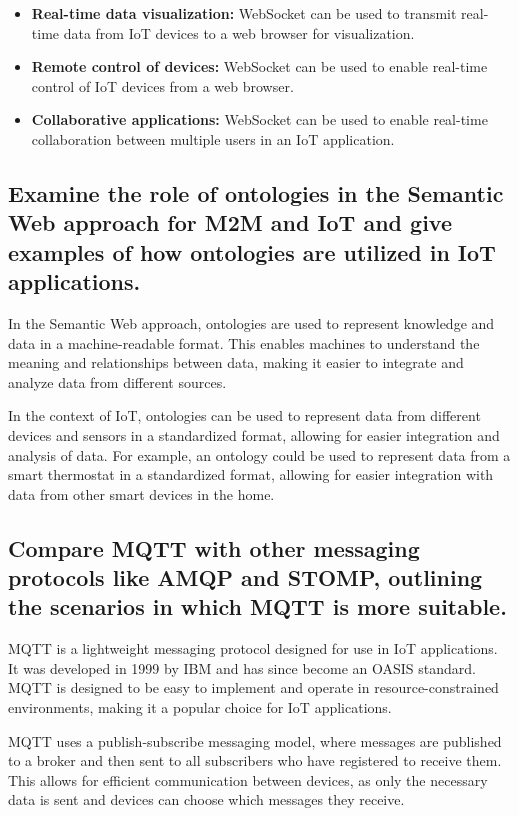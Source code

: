 \documentclass[12pt, a4paper, oneside]{article}
\begin{document}
\begin{itemize}
	\item \textbf{Real-time data visualization:} WebSocket can be used to transmit real-time data from IoT devices to a web browser for visualization.
	\item \textbf{Remote control of devices:} WebSocket can be used to enable real-time control of IoT devices from a web browser.
	\item \textbf{Collaborative applications:} WebSocket can be used to enable real-time collaboration between multiple users in an IoT application.
\end{itemize}

\subsection{Examine the role of ontologies in the Semantic Web approach for M2M and IoT and give examples of how ontologies are utilized in IoT applications.}

In the Semantic Web approach, ontologies are used to represent knowledge and data in a machine-readable format. This enables machines to understand the meaning and relationships between data, making it easier to integrate and analyze data from different sources.

In the context of IoT, ontologies can be used to represent data from different devices and sensors in a standardized format,
allowing for easier integration and analysis of data. For example, an ontology could be used to represent data from a smart thermostat in a standardized format, allowing for easier integration with data from other smart devices in the home.

\subsection{Compare MQTT with other messaging protocols like AMQP and STOMP, outlining the  scenarios in which MQTT is more suitable.}

MQTT is a lightweight messaging protocol designed for use in IoT applications. It was developed in 1999 by IBM and has since become an OASIS standard. MQTT is designed to be easy to implement and operate in resource-constrained environments, making it a popular choice for IoT applications.

MQTT uses a publish-subscribe messaging model, where messages are published to a broker and then sent to all subscribers who have registered to receive them. This allows for efficient communication between devices, as only the necessary data is sent and devices can choose which messages they receive.
\end{document}
